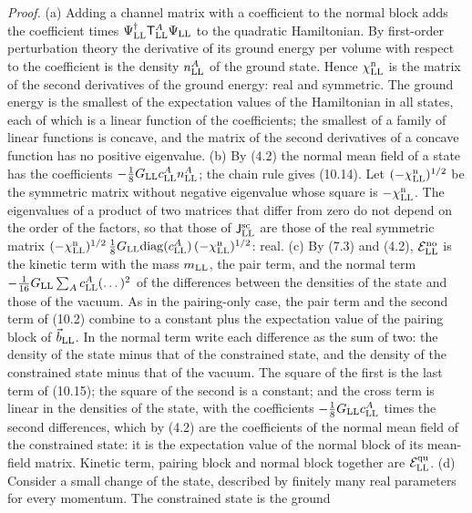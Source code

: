 \documentclass[
  10pt,
]{article}
\begin{document}
\emph{Proof.} (a) Adding a channel matrix with a coefficient to the
normal block adds the coefficient times
\(\Psi^\dagger_{\rm LL}\mathsf T^A_{\rm LL}\Psi_{\rm LL}\) to the
quadratic Hamiltonian. By first-order perturbation theory the derivative
of its ground energy per volume with respect to the coefficient is the
density \(n^A_{\rm LL}\) of the ground state. Hence
\(\chi^{\rm n}_{\rm LL}\) is the matrix of the second derivatives of the
ground energy: real and symmetric. The ground energy is the smallest of
the expectation values of the Hamiltonian in all states, each of which
is a linear function of the coefficients; the smallest of a family of
linear functions is concave, and the matrix of the second derivatives of
a concave function has no positive eigenvalue. (b) By (4.2) the normal
mean field of a state has the coefficients
\(-\tfrac18G_{\rm LL}c^A_{\rm LL}n^A_{\rm LL}\); the chain rule gives
(10.14). Let \((-\chi^{\rm n}_{\rm LL})^{1/2}\) be the symmetric matrix
without negative eigenvalue whose square is \(-\chi^{\rm n}_{\rm LL}\).
The eigenvalues of a product of two matrices that differ from zero do
not depend on the order of the factors, so that those of
\(\mathsf J^{\rm sc}_{\rm LL}\) are those of the real symmetric matrix
\((-\chi^{\rm n}_{\rm LL})^{1/2}\,\tfrac18G_{\rm LL}\mathrm{diag}(c^A_{\rm LL})\,(-\chi^{\rm n}_{\rm LL})^{1/2}\):
real. (c) By (7.3) and (4.2), \(\mathcal E^{\rm no}_{\rm LL}\) is the
kinetic term with the mass \(m_{\rm LL}\), the pair term, and the normal
term \(-\tfrac1{16}G_{\rm LL}\sum_Ac^A_{\rm LL}(\dots)^2\) of the
differences between the densities of the state and those of the vacuum.
As in the pairing-only case, the pair term and the second term of (10.2)
combine to a constant plus the expectation value of the pairing block of
\(\vec b_{\rm LL}\). In the normal term write each difference as the sum
of two: the density of the state minus that of the constrained state,
and the density of the constrained state minus that of the vacuum. The
square of the first is the last term of (10.15); the square of the
second is a constant; and the cross term is linear in the densities of
the state, with the coefficients \(-\tfrac18G_{\rm LL}c^A_{\rm LL}\)
times the second differences, which by (4.2) are the coefficients of the
normal mean field of the constrained state: it is the expectation value
of the normal block of its mean-field matrix. Kinetic term, pairing
block and normal block together are \(\mathcal E^{\rm qu}_{\rm LL}\).
(d) Consider a small change of the state, described by finitely many
real parameters for every momentum. The constrained state is the ground
\end{document}
